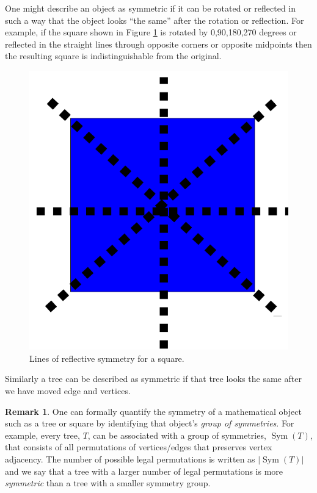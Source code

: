 \documentclass[10pt]{amsart} %
\theoremstyle{definition}
\newtheorem*{rem}{Remark}
\DeclareMathOperator{\Sym}{Sym}
\begin{document}
One might describe an object as symmetric if it can be rotated or reflected in such a way that the object looks ``the same'' 
after the rotation or reflection. For example, if the square shown in Figure \ref{fig:a} is rotated by 0,90,180,270 degrees or
reflected in the straight lines through opposite corners or opposite midpoints then the resulting square is indistinguishable 
from the original.

\begin{figure}[h]

              \centering
               \includegraphics[scale=0.25]{square.png}
                \caption{Lines of reflective symmetry for a square.}\label{fig:a}
\end{figure}


Similarly a tree can be described as symmetric if that tree looks the same after we have 
moved edge and vertices.    

\begin{rem}
One can formally quantify the symmetry of a mathematical object such as a tree or square by identifying that object's 
\emph{group of symmetries}.  For example, every tree, $T$, can be associated with a group of symmetries, $\Sym(T)$, that 
consists of all permutations of vertices/edges that preserves vertex adjacency. The number of possible legal permutations 
is written as $\lvert\Sym(T)\rvert$ and we say that a tree with a larger number of legal permutations is more \emph{symmetric}
than a tree with a smaller symmetry group.  
\end{rem}
\end{document}
